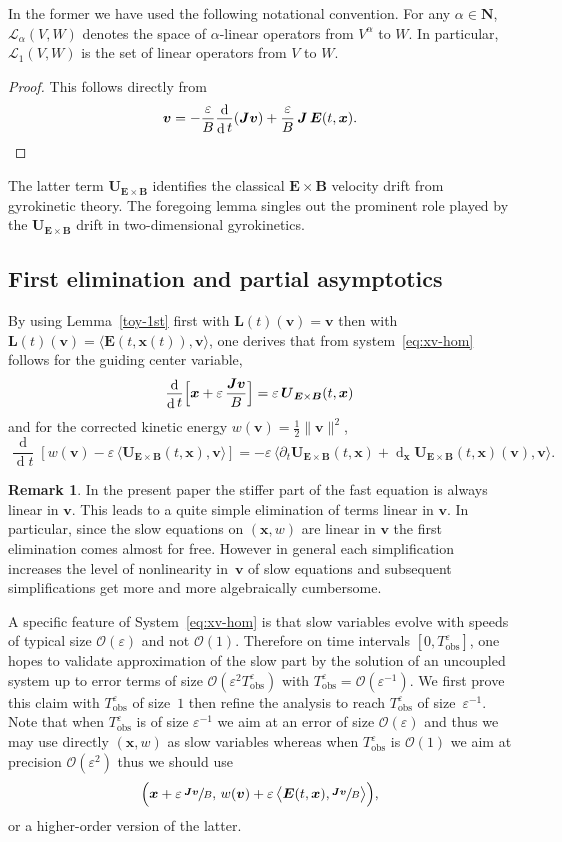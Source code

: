 \documentclass[JEP,XML,SOM,Unicode]{cedram}
\let\mathcal\mathscr
\newcommand{\blangle}{\bigl\langle}
\newcommand{\brangle}{\bigr\rangle}
\let\eps\varepsilon
\let\d\partial
\DeclareMathOperator\dD{d}\let\dd\dD
\theoremstyle{plain}
\theoremstyle{definition}
\newtheorem{remark}[theorem]{Remark}
\newcommand\br{\begin{remark}}
\newcommand\er{\end{remark}}
\newcommand{\be}{\begin{equation}}
\newcommand{\ee}{\end{equation}}
\newcommand{\N}{\mathbf N}
\newcommand\bB{{\boldsymbol B}}
\newcommand\bE{{\boldsymbol E}}
\newcommand\bJ{{\boldsymbol J}}
\newcommand\bL{{\boldsymbol L}}
\newcommand\bU{{\boldsymbol U}}
\newcommand\bfv{{\boldsymbol v}}
\newcommand\bfx{{\boldsymbol x}}
\newcommand\cL{{\mathcal L}}
\newcommand\cO{{\mathcal O}}
\let\e w
\newcommand{\EcB}{\bU_{\bE\times\bB}}
\newcommand{\tobs}{T_{\mathrm{obs}}}
\begin{document}
In the former we have used the following notational convention. For any \hbox{$\alpha\in\N$}, $\cL_\alpha(V,W)$ denotes the space of $\alpha$-linear operators from
$V^\alpha$ to $W$. In particular, $\cL_1(V,W)$ is the set of linear operators from $V$ to $W$.

\begin{proof}
This follows directly from
\[
\bfv=
-\frac{\eps}{B}\frac{\dD}{\dD t}(\bJ\bfv)+\frac{\eps}{B}\,\bJ\,\bE(t,\bfx).\qedhere
\]
\end{proof}

The latter term $\EcB$ identifies the classical $\bE\times\bB$ velocity drift from gyrokinetic theory. The foregoing lemma singles out the prominent role played by the $\EcB$ drift in two-dimensional gyrokinetics.

\subsection{First elimination and partial asymptotics}

By using Lemma~\ref{toy-1st} first with $\bL(t)(\bfv)=\bfv$ then
with $\bL(t)(\bfv)=\langle\bE(t,\bfx(t)),\bfv\rangle$, one derives
that from system~\eqref{eq:xv-hom} follows for the guiding center
variable,
\be
\label{toy-x1}
\frac{\dD}{\dD t}\Bigl[\bfx
+\eps\,\frac{\bJ\bfv}{B}\Bigr]
= \eps\,\EcB(t,\bfx)
\ee
and for the corrected kinetic energy $\e(\bfv)=\frac{1}{2}\|\bfv\|^2$,
\be
\label{toy-e1}
\frac{\dD}{\dD t}\left[\e(\bfv)-
\eps\,\blangle\EcB(t,\bfx),\bfv\brangle\right]
=
-\eps\,\blangle\d_t\EcB(t,\bfx)
+\dD_\bfx\EcB(t,\bfx)(\bfv),\bfv\brangle.
\ee

\br
In the present paper the stiffer part of the fast equation is always linear in $\bfv$. This leads to a quite simple elimination of terms linear in $\bfv$. In particular, since the slow equations on $(\bfx,\e)$ are linear in $\bfv$ the first elimination comes almost for free. However in general each simplification increases the level of nonlinearity in~$\bfv$ of slow equations and subsequent simplifications get more and more algebraically cumbersome.
\er

A specific feature of System~\eqref{eq:xv-hom} is that slow variables evolve with speeds of typical size $\cO(\eps)$ and not $\cO(1)$. Therefore on time intervals $[0,\tobs^\eps]$, one hopes to validate approximation of the slow part by the solution of an uncoupled system up to error terms of size $\cO(\eps^2\tobs^\eps)$ with $\tobs^\eps=\cO(\eps^{-1})$. We first prove this claim with $\tobs^\eps$ of size~$1$ then refine the analysis to reach $\tobs^\eps$ of size~$\eps^{-1}$. Note that when $\tobs^\eps$ is of size $\eps^{-1}$ we aim at an error of size $\cO(\eps)$ and thus we may use directly $(\bfx,w)$ as slow variables whereas when $\tobs^\eps$ is $\cO(1)$ we aim at precision $\cO(\eps^2)$ thus we should use
\[
\Bigl(\bfx+\eps\, \sfrac{\bJ\bfv}{B},\,\e(\bfv)+
\eps\,\blangle\bE(t,\bfx),\sfrac{\bJ\bfv}{B}\brangle\Bigr),
\]
or a higher-order version of the latter.
\end{document}
